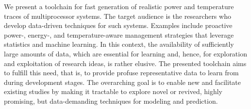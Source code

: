 We present a toolchain for fast generation of realistic power and temperature
traces of multiprocessor systems. The target audience is the researchers who
develop data-driven techniques for such systems. Examples include proactive
\mbox{power-,} \mbox{energy-,} and temperature-aware management strategies that
leverage statistics and machine learning. In this context, the availability of
sufficiently large amounts of data, which are essential for learning and, hence,
for exploration and exploitation of research ideas, is rather elusive. The
presented toolchain aims to fulfill this need, that is, to provide profuse
representative data to learn from during development stages. The overarching
goal is to enable new and facilitate existing studies by making it tractable to
explore novel or revived, highly promising, but data-demanding techniques for
modeling and prediction.
